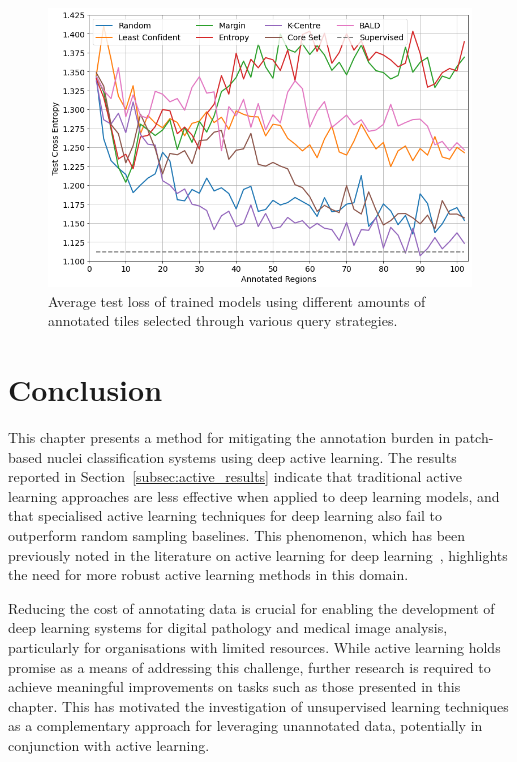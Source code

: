 \begin{figure}
	\centering
	\includegraphics[width=\textwidth]{images/active_learning_loss.png}
	\caption{Average test loss of trained models using different amounts of annotated tiles selected through various query strategies.}
	\label{fig:active_learning_loss}
\end{figure}



\section{Conclusion}
\label{sec:active_conclusion}


This chapter presents a method for mitigating the annotation burden in patch-based nuclei classification systems using deep active learning. The results reported in Section~\ref{subsec:active_results} indicate that traditional active learning approaches are less effective when applied to deep learning models, and that specialised active learning techniques for deep learning also fail to outperform random sampling baselines. This phenomenon, which has been previously noted in the literature on active learning for deep learning~\citep{ren2021survey}, highlights the need for more robust active learning methods in this domain.

Reducing the cost of annotating data is crucial for enabling the development of deep learning systems for digital pathology and medical image analysis, particularly for organisations with limited resources. While active learning holds promise as a means of addressing this challenge, further research is required to achieve meaningful improvements on tasks such as those presented in this chapter. This has motivated the investigation of unsupervised learning techniques as a complementary approach for leveraging unannotated data, potentially in conjunction with active learning.